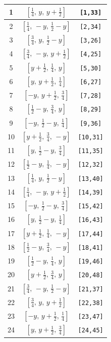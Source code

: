 \documentclass[fleqn,8pt]{jsarticle}
\begin{document}
\begin{longtable}{ccc}
1 & $\left[ \frac{1}{4},\, y,\, y + \frac{1}{2} \right]$ & {\tt [1,33]} \\ \hline
2 & $\left[ \frac{1}{4},\, - y,\, \frac{1}{2} - y \right]$ & {\tt [2,34]} \\ \hline
3 & $\left[ \frac{3}{4},\, y,\, \frac{1}{2} - y \right]$ & {\tt [3,26]} \\ \hline
4 & $\left[ \frac{3}{4},\, - y,\, y + \frac{1}{2} \right]$ & {\tt [4,25]} \\ \hline
5 & $\left[ y + \frac{1}{2},\, \frac{1}{4},\, y \right]$ & {\tt [5,30]} \\ \hline
6 & $\left[ y,\, y + \frac{1}{2},\, \frac{1}{4} \right]$ & {\tt [6,27]} \\ \hline
7 & $\left[ - y,\, y + \frac{1}{2},\, \frac{3}{4} \right]$ & {\tt [7,28]} \\ \hline
8 & $\left[ \frac{1}{2} - y,\, \frac{3}{4},\, y \right]$ & {\tt [8,29]} \\ \hline
9 & $\left[ - y,\, \frac{1}{2} - y,\, \frac{1}{4} \right]$ & {\tt [9,36]} \\ \hline
10 & $\left[ y + \frac{1}{2},\, \frac{3}{4},\, - y \right]$ & {\tt [10,31]} \\ \hline
11 & $\left[ y,\, \frac{1}{2} - y,\, \frac{3}{4} \right]$ & {\tt [11,35]} \\ \hline
12 & $\left[ \frac{1}{2} - y,\, \frac{1}{4},\, - y \right]$ & {\tt [12,32]} \\ \hline
13 & $\left[ \frac{1}{4},\, y,\, \frac{1}{2} - y \right]$ & {\tt [13,40]} \\ \hline
14 & $\left[ \frac{1}{4},\, - y,\, y + \frac{1}{2} \right]$ & {\tt [14,39]} \\ \hline
15 & $\left[ - y,\, \frac{1}{2} - y,\, \frac{3}{4} \right]$ & {\tt [15,42]} \\ \hline
16 & $\left[ y,\, \frac{1}{2} - y,\, \frac{1}{4} \right]$ & {\tt [16,43]} \\ \hline
17 & $\left[ y + \frac{1}{2},\, \frac{1}{4},\, - y \right]$ & {\tt [17,44]} \\ \hline
18 & $\left[ \frac{1}{2} - y,\, \frac{3}{4},\, - y \right]$ & {\tt [18,41]} \\ \hline
19 & $\left[ \frac{1}{2} - y,\, \frac{1}{4},\, y \right]$ & {\tt [19,46]} \\ \hline
20 & $\left[ y + \frac{1}{2},\, \frac{3}{4},\, y \right]$ & {\tt [20,48]} \\ \hline
21 & $\left[ \frac{3}{4},\, - y,\, \frac{1}{2} - y \right]$ & {\tt [21,37]} \\ \hline
22 & $\left[ \frac{3}{4},\, y,\, y + \frac{1}{2} \right]$ & {\tt [22,38]} \\ \hline
23 & $\left[ - y,\, y + \frac{1}{2},\, \frac{1}{4} \right]$ & {\tt [23,47]} \\ \hline
24 & $\left[ y,\, y + \frac{1}{2},\, \frac{3}{4} \right]$ & {\tt [24,45]} \\
\end{longtable}
\end{document}
